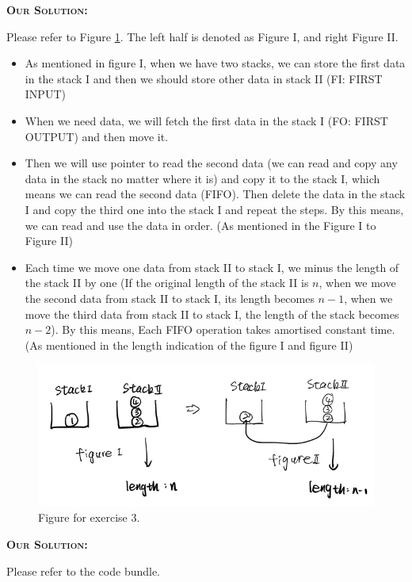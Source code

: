 \documentclass{exam}
\renewenvironment{solution}{\textsc{\textbf{Our Solution:}} \par}{}
\begin{document}
\begin{questions}
	\question
	\begin{solution}
		Please refer to Figure \ref{fig_ex3}. The left half is denoted as Figure I, and right Figure II.
		\begin{itemize}
			\item As mentioned in figure I, when we have two stacks, we can store the first data in the stack I and then we should store other data in stack II (FI: FIRST INPUT)
			\item When we need data, we will fetch the first data in the stack I (FO: FIRST OUTPUT) and then move it.
			\item Then we will use pointer to read the second data (we can read and copy any data in the stack no matter where it is) and copy it to the stack I, which means we can read the second data (FIFO). Then delete the data in the stack I and copy the third one into the stack I and repeat the steps. By this means, we can read and use the data in order. (As mentioned in the Figure I to Figure II)
			\item Each time we move one data from stack II to stack I, we minus the length of the stack II by one (If the original length of the stack II is $n$, when we move the second data from stack II to stack I, its length becomes $n-1$, when we move the third data from stack II to stack I, the length of the stack becomes $n-2$). By this means, Each FIFO operation takes amortised constant time. (As mentioned in the length indication of the figure I and figure II)
		\end{itemize}
		\begin{figure}
			\centering
			\includegraphics[width=16cm]{fig_ex3.png}
			\caption{Figure for exercise 3.}
			\label{fig_ex3}
		\end{figure}
	\end{solution}



	\question
	\begin{solution}
		Please refer to the code bundle.
	\end{solution}
\end{questions}
\end{document}
